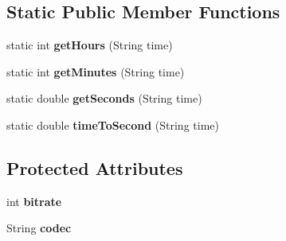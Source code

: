 \subsection*{Static Public Member Functions}
\begin{DoxyCompactItemize}
\item 
\hypertarget{classvideo_1_1_profile_a1564131af01a721970347c072ab74cee}{
static int {\bfseries getHours} (String time)}
\label{classvideo_1_1_profile_a1564131af01a721970347c072ab74cee}

\item 
\hypertarget{classvideo_1_1_profile_ac055604e2ca11b4542f4950edd1ed8e8}{
static int {\bfseries getMinutes} (String time)}
\label{classvideo_1_1_profile_ac055604e2ca11b4542f4950edd1ed8e8}

\item 
\hypertarget{classvideo_1_1_profile_abfbff1b50a286514a7360e8a487c8df1}{
static double {\bfseries getSeconds} (String time)}
\label{classvideo_1_1_profile_abfbff1b50a286514a7360e8a487c8df1}

\item 
\hypertarget{classvideo_1_1_profile_ae9c355bb1ad4eea4710e1576f6491e7b}{
static double {\bfseries timeToSecond} (String time)}
\label{classvideo_1_1_profile_ae9c355bb1ad4eea4710e1576f6491e7b}

\end{DoxyCompactItemize}
\subsection*{Protected Attributes}
\begin{DoxyCompactItemize}
\item 
\hypertarget{classvideo_1_1_profile_a7624d7f536ea2a341c34b1259be8bd37}{
int {\bfseries bitrate}}
\label{classvideo_1_1_profile_a7624d7f536ea2a341c34b1259be8bd37}

\item 
\hypertarget{classvideo_1_1_profile_a595fc7235e8a8898ca96b078f4b0036c}{
String {\bfseries codec}}
\label{classvideo_1_1_profile_a595fc7235e8a8898ca96b078f4b0036c}

\end{DoxyCompactItemize}


